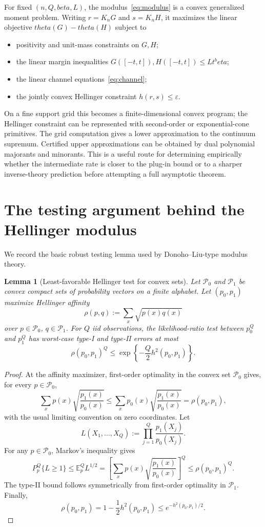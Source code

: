 \documentclass[11pt]{article}
\def\beta{beta}%
\def\theta{theta}%
\newtheorem{lemma}[theorem]{Lemma}
\newcommand{\E}{\mathbb E}
\newcommand{\eps}{\varepsilon}
\begin{document}
For fixed $(n,Q,\beta,L)$, the modulus~\eqref{eq:modulus} is a convex generalized moment problem.  Writing $r=K_nG$ and $s=K_nH$, it maximizes the linear objective $\theta(G)-\theta(H)$ subject to
\begin{itemize}
\item positivity and unit-mass constraints on $G,H$;
\item the linear margin inequalities $G([-t,t]),H([-t,t])\le Lt^\beta$;
\item the linear channel equations~\eqref{eq:channel};
\item the jointly convex Hellinger constraint $h(r,s)\le\eps$.
\end{itemize}
On a fine support grid this becomes a finite-dimensional convex program; the Hellinger constraint can be represented with second-order or exponential-cone primitives.  The grid computation gives a lower approximation to the continuum supremum.  Certified upper approximations can be obtained by dual polynomial majorants and minorants.  This is a useful route for determining empirically whether the intermediate rate is closer to the plug-in bound or to a sharper inverse-theory prediction before attempting a full asymptotic theorem.

\appendix

\section{The testing argument behind the Hellinger modulus}
\label{app:modulus}

We record the basic robust testing lemma used by Donoho--Liu-type modulus theory.

\begin{lemma}[Least-favorable Hellinger test for convex sets]
\label{lem:robust-test}
Let $\mathcal P_0$ and $\mathcal P_1$ be convex compact sets of probability vectors on a finite alphabet.  Let $(p_0,p_1)$ maximize Hellinger affinity
\[
\rho(p,q):=\sum_x\sqrt{p(x)q(x)}
\]
over $p\in\mathcal P_0$, $q\in\mathcal P_1$.  For $Q$ iid observations, the likelihood-ratio test between $p_0^Q$ and $p_1^Q$ has worst-case type-I and type-II errors at most
\[
\rho(p_0,p_1)^Q
\le
\exp\left\{-\frac Q2 h^2(p_0,p_1)\right\}.
\]
\end{lemma}

\begin{proof}
At the affinity maximizer, first-order optimality in the convex set $\mathcal P_0$ gives, for every $p\in\mathcal P_0$,
\[
\sum_x p(x)\sqrt{\frac{p_1(x)}{p_0(x)}}
\le
\sum_x p_0(x)\sqrt{\frac{p_1(x)}{p_0(x)}}
=\rho(p_0,p_1),
\]
with the usual limiting convention on zero coordinates.  Let
\[
L(X_1,\dots,X_Q)
:=\prod_{j=1}^Q\frac{p_1(X_j)}{p_0(X_j)}.
\]
For any $p\in\mathcal P_0$, Markov's inequality gives
\[
P_p^Q\{L\ge1\}
\le
\E_p^Q L^{1/2}
=
\left[
\sum_x p(x)\sqrt{\frac{p_1(x)}{p_0(x)}}
\right]^Q
\le\rho(p_0,p_1)^Q.
\]
The type-II bound follows symmetrically from first-order optimality in $\mathcal P_1$.  Finally,
\[
\rho(p_0,p_1)=1-\frac12h^2(p_0,p_1)
\le e^{-h^2(p_0,p_1)/2}.
\]
\end{proof}
\end{document}

